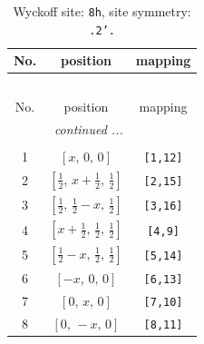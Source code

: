 \documentclass[fleqn,8pt]{jsarticle}
\begin{document}
\begin{longtable}{ccc}
\caption{Wyckoff site: {\tt 8h}, site symmetry: {\tt .2'.}}
 \\
 \hline \hline
No. & position & mapping \\ \hline \endfirsthead

\multicolumn{2}{l}{\tablename\ \thetable{}} \\
 \hline \hline
No. & position & mapping \\ \hline \endhead

 \hline \hline
\multicolumn{2}{r}{\footnotesize\it continued ...} \\ \endfoot

 \hline \hline
\multicolumn{2}{r}{} \\ \endlastfoot

1 & $\left[ x,\, 0,\, 0 \right]$ & {\tt [1,12]} \\ \hline
2 & $\left[ \frac{1}{2},\, x + \frac{1}{2},\, \frac{1}{2} \right]$ & {\tt [2,15]} \\ \hline
3 & $\left[ \frac{1}{2},\, \frac{1}{2} - x,\, \frac{1}{2} \right]$ & {\tt [3,16]} \\ \hline
4 & $\left[ x + \frac{1}{2},\, \frac{1}{2},\, \frac{1}{2} \right]$ & {\tt [4,9]} \\ \hline
5 & $\left[ \frac{1}{2} - x,\, \frac{1}{2},\, \frac{1}{2} \right]$ & {\tt [5,14]} \\ \hline
6 & $\left[ - x,\, 0,\, 0 \right]$ & {\tt [6,13]} \\ \hline
7 & $\left[ 0,\, x,\, 0 \right]$ & {\tt [7,10]} \\ \hline
8 & $\left[ 0,\, - x,\, 0 \right]$ & {\tt [8,11]} \\
\end{longtable}
\renewcommand{\arraystretch}{1.2}
\end{document}
